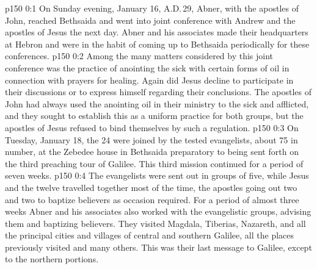 \author{Midwayer Commission}
\vs p150 0:1 On Sunday evening, January 16, A.D.\,29, Abner, with the apostles of John, reached Bethsaida and went into joint conference with Andrew and the apostles of Jesus the next day. Abner and his associates made their headquarters at Hebron and were in the habit of coming up to Bethsaida periodically for these conferences.
\vs p150 0:2 Among the many matters considered by this joint conference was the practice of anointing the sick with certain forms of oil in connection with prayers for healing. Again did Jesus decline to participate in their discussions or to express himself regarding their conclusions. The apostles of John had always used the anointing oil in their ministry to the sick and afflicted, and they sought to establish this as a uniform practice for both groups, but the apostles of Jesus refused to bind themselves by such a regulation.
\vs p150 0:3 \pc On Tuesday, January 18, the 24 were joined by the tested evangelists, about 75 in number, at the Zebedee house in Bethsaida preparatory to being sent forth on the third preaching tour of Galilee. This third mission continued for a period of seven weeks.
\vs p150 0:4 The evangelists were sent out in groups of five, while Jesus and the twelve travelled together most of the time, the apostles going out two and two to baptize believers as occasion required. For a period of almost three weeks Abner and his associates also worked with the evangelistic groups, advising them and baptizing believers. They visited Magdala, Tiberias, Nazareth, and all the principal cities and villages of central and southern Galilee, all the places previously visited and many others. This was their last message to Galilee, except to the northern portions.
